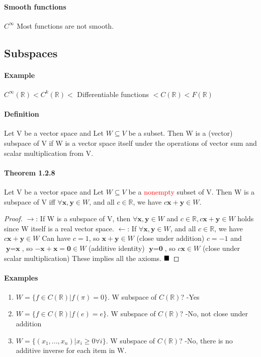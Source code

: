 \documentclass[11pt]{article}
\newcommand{\tb}[1]{\textbf{#1}}
\newcommand{\qed}[0]{$\hfill\blacksquare$}
\newcommand{\real}[0]{\mathbb{R}}
\newcommand{\vx}[0]{\tb{x}}
\newcommand{\vy}[0]{\tb{y}}
\newcommand{\vo}[0]{\tb{0}}
\begin{document}
	\paragraph{Smooth functions}
	$C^\infty$ \newline
	Most functions are not smooth.
	\subsection{Subspaces}
	\paragraph{Example}
	$C^\infty(\real) < C^k(\real) <$ Differentiable functions $< C(\real) < F(\real)$  
	\paragraph{Definition} Let V be a vector space and Let $W \subseteq V$ be a subset. Then W is a (vector) subspace of V if W is a vector space itself under the operations of vector sum and scalar multiplication from V.
	\paragraph{Theorem 1.2.8}  Let V be a vector space and Let $W \subseteq V$ be a \textcolor{red}{nonempty} subset of V. Then W is a subspace of V iff $\forall \vx, \vy \in W$, and all $c \in \real$, we have $c\vx + \vy \in W$. \newline
	\begin{proof}
	$\rightarrow$: If W is a subspace of V, then $\forall \vx, \vy \in W$ and $c \in \real, c\vx + \vy \in W$ holds since W itself is a real vector space. \newline
	$\leftarrow$: If $\forall \vx, \vy \in W$, and all $c \in \real$, we have $c\vx + \vy \in W$ \newline
	Can have $c = 1$, so $\vx + \vy \in W$ (close under addition) \newline
	$c = -1$ and $\vy = \vx$, so $-\vx + \vx = \vo \in W$ (additive identity) \newline
	$\vy = \vo$, so  $c\vx \in W$ (close under scalar multiplication) \newline
	These implies all the axioms. \qed
	\end{proof}

	\paragraph{Examples}
	\begin{enumerate}
		\item $W = \{f\in C(\real) | f(\pi) = 0\}$. W subspace of $C(\real)$? -Yes
		\item $W = \{f\in C(\real) | f(e) = e\}$. W subspace of $C(\real)$? -No, not close under addition
		\item $W = \{(x_1,...,x_n) | x_i\geq 0 \forall i\}$. W subspace of $C(\real)$? -No, there is no additive inverse for each item in W.
	\end{enumerate}
\end{document}
